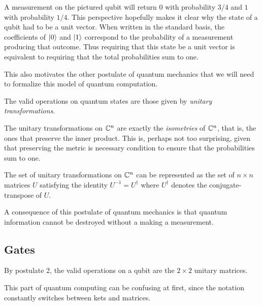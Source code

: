     A measurement on the pictured qubit will return 0 with probability $3/4$ and $1$ with probability $1/4$. This 
    perspective hopefully makes it clear why the state of a qubit had to be a unit vector. When written in the 
    standard basis, the coefficients of $\ket{0}$ and $\ket{1}$ correspond to the probability of a measurement 
    producing that outcome. Thus requiring that this state be a unit vector is equivalent to requiring that the 
    total probabilities sum to one.


    This also motivates the other postulate of quantum mechanics that we will need to formalize this model of 
    quantum computation. 

    \begin{postulate}
        The valid operations on quantum states are those given by \emph{unitary transformations}.
    \end{postulate}

    The unitary transformations on $\mathbb{C}^n$ are exactly the \emph{isometries} of $\mathbb{C}^n$, that is, the ones that 
    preserve the inner product. This is, perhaps not too surprising, given that preserving the metric is necessary 
    condition to ensure that the probabilities sum to one. 

    \begin{definition}
        The set of unitary transformations on $\mathbb{C}^n$ can be represented as the set of $n \times n$ matrices $U$ 
        satisfying the identity $U^{-1} = U^\dagger$ where $U^\dagger$ denotes the conjugate-transpose of $U$.
    \end{definition}

    A consequence of this postulate of quantum mechanics is that quantum information cannot be destroyed without a 
    making a measurement.

    
    
\subsection{Gates}
        
        By postulate 2, the valid operations on a qubit are the $2 \times 2$ unitary matrices.
        

        This part of quantum computing can be confusing at first, since the notation constantly switches between 
        kets and matrices.

